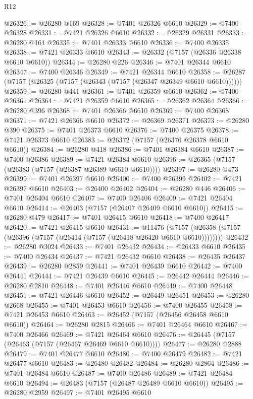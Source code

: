 \begin{lexlean}{R12}
\begin{coremodule}
{{{{{{{{{{{{{{{{{{{{{{{{{{{{{{{{{{{{{{{{{{{{{{{{{{{{{{{{{{{{{{{{{{{{{{{{{{{{{{{{{{@26326 := @26280 @169
@26328 := @7401 @26326 @6610
@26329 := @7400 @26328
@26331 := @7421 @26326 @6610
@26332 := @26329 @26331
@26333 := @26280 @164
@26335 := @7401 @26333 @6610
@26336 := @7400 @26335
@26338 := @7421 @26333 @6610
@26343 := @26332 (@7157 (@26336 @26338 @6610 @6610))
@26344 := @26280 @226
@26346 := @7401 @26344 @6610
@26347 := @7400 @26346
@26349 := @7421 @26344 @6610
@26358 := @26287 (@7157 (@26325 (@7157 (@26343 (@7157 (@26347 @26349 @6610 @6610))))))
@26359 := @26280 @441
@26361 := @7401 @26359 @6610
@26362 := @7400 @26361
@26364 := @7421 @26359 @6610
@26365 := @26362 @26364
@26366 := @26280 @396
@26368 := @7401 @26366 @6610
@26369 := @7400 @26368
@26371 := @7421 @26366 @6610
@26372 := @26369 @26371
@26373 := @26280 @390
@26375 := @7401 @26373 @6610
@26376 := @7400 @26375
@26378 := @7421 @26373 @6610
@26383 := @26372 (@7157 (@26376 @26378 @6610 @6610))
@26384 := @26280 @418
@26386 := @7401 @26384 @6610
@26387 := @7400 @26386
@26389 := @7421 @26384 @6610
@26396 := @26365 (@7157 (@26383 (@7157 (@26387 @26389 @6610 @6610))))
@26397 := @26280 @473
@26399 := @7401 @26397 @6610
@26400 := @7400 @26399
@26402 := @7421 @26397 @6610
@26403 := @26400 @26402
@26404 := @26280 @446
@26406 := @7401 @26404 @6610
@26407 := @7400 @26406
@26409 := @7421 @26404 @6610
@26414 := @26403 (@7157 (@26407 @26409 @6610 @6610))
@26415 := @26280 @479
@26417 := @7401 @26415 @6610
@26418 := @7400 @26417
@26420 := @7421 @26415 @6610
@26431 := @11476
    (@7157 (@26358 (@7157 (@26396 (@7157 (@26414 (@7157 (@26418 @26420 @6610 @6610))))))))
@26432 := @26280 @3024
@26433 := @7401 @26432
@26434 := @26433 @6610
@26435 := @7400 @26434
@26437 := @7421 @26432 @6610
@26438 := @26435 @26437
@26439 := @26280 @2859
@26441 := @7401 @26439 @6610
@26442 := @7400 @26441
@26444 := @7421 @26439 @6610
@26445 := @26442 @26444
@26446 := @26280 @2810
@26448 := @7401 @26446 @6610
@26449 := @7400 @26448
@26451 := @7421 @26446 @6610
@26452 := @26449 @26451
@26453 := @26280 @2668
@26455 := @7401 @26453 @6610
@26456 := @7400 @26455
@26458 := @7421 @26453 @6610
@26463 := @26452 (@7157 (@26456 @26458 @6610 @6610))
@26464 := @26280 @2815
@26466 := @7401 @26464 @6610
@26467 := @7400 @26466
@26469 := @7421 @26464 @6610
@26476 := @26445 (@7157 (@26463 (@7157 (@26467 @26469 @6610 @6610))))
@26477 := @26280 @2888
@26479 := @7401 @26477 @6610
@26480 := @7400 @26479
@26482 := @7421 @26477 @6610
@26483 := @26480 @26482
@26484 := @26280 @2864
@26486 := @7401 @26484 @6610
@26487 := @7400 @26486
@26489 := @7421 @26484 @6610
@26494 := @26483 (@7157 (@26487 @26489 @6610 @6610))
@26495 := @26280 @2959
@26497 := @7401 @26495 @6610
}}}}}}}}}}}}}}}}}}}}}}}}}}}}}}}}}}}}}}}}}}}}}}}}}}}}}}}}}}}}}}}}}}}}}}}}}}}}}}}}}}
\end{coremodule}
\end{lexlean}
